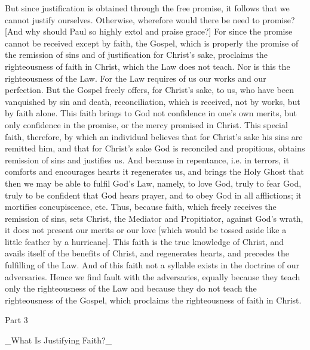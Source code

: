 But since justification is obtained through the free promise, it
follows that we cannot justify ourselves.  Otherwise, wherefore would
there be need to promise?  [And why should Paul so highly extol and
praise grace?] For since the promise cannot be received except by
faith, the Gospel, which is properly the promise of the remission of
sins and of justification for Christ's sake, proclaims the
righteousness of faith in Christ, which the Law does not teach.  Nor
is this the righteousness of the Law.  For the Law requires of us our
works and our perfection.  But the Gospel freely offers, for Christ's
sake, to us, who have been vanquished by sin and death,
reconciliation, which is received, not by works, but by faith alone.
This faith brings to God not confidence in one's own merits, but only
confidence in the promise, or the mercy promised in Christ.  This
special faith, therefore, by which an individual believes that for
Christ's sake his sins are remitted him, and that for Christ's sake
God is reconciled and propitious, obtains remission of sins and
justifies us.  And because in repentance, i.e. in terrors, it
comforts and encourages hearts it regenerates us, and brings the Holy
Ghost that then we may be able to fulfil God's Law, namely, to love
God, truly to fear God, truly to be confident that God hears prayer,
and to obey God in all afflictions; it mortifies concupiscence, etc.
Thus, because faith, which freely receives the remission of sins,
sets Christ, the Mediator and Propitiator, against God's wrath, it
does not present our merits or our love [which would be tossed aside
like a little feather by a hurricane].  This faith is the true
knowledge of Christ, and avails itself of the benefits of Christ, and
regenerates hearts, and precedes the fulfilling of the Law.  And of
this faith not a syllable exists in the doctrine of our adversaries.
Hence we find fault with the adversaries, equally because they teach
only the righteousness of the Law and because they do not teach the
righteousness of the Gospel, which proclaims the righteousness of
faith in Christ.




Part 3


_What Is Justifying Faith?_

